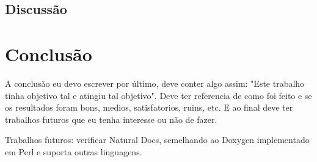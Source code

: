 \section{Discussão}

\chapter{Conclusão}

A conclusão eu devo escrever por último, deve conter algo assim: "Este trabalho tinha objetivo tal e atingiu tal objetivo". Deve ter referencia de como foi feito e se os resultados foram bons, medios, satisfatorios, ruins, etc. E ao final deve ter trabalhos futuros que eu tenha interesse ou não de fazer.

Trabalhos futuros: verificar Natural Docs, semelhando ao Doxygen implementado em Perl e suporta outras linguagens.
